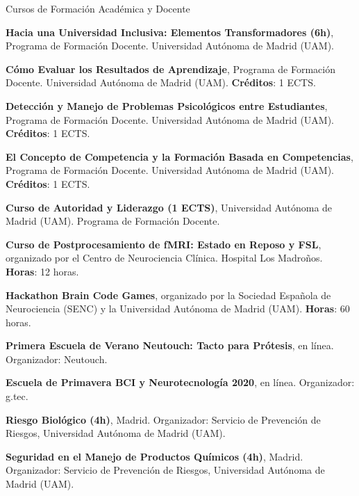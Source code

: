 \begin{rubric}{Cursos de Formación Académica y Docente}
	
	\entry*[9-11 de mayo de 2022] \textbf{Hacia una Universidad Inclusiva: Elementos Transformadores (6h)}, Programa de Formación Docente. Universidad Autónoma de Madrid (UAM).
	
	
	\entry*[15-17 de febrero de 2023] \textbf{Cómo Evaluar los Resultados de Aprendizaje}, Programa de Formación Docente. Universidad Autónoma de Madrid (UAM). \textbf{Créditos}: 1 ECTS.
	
	\entry*[20-27 de abril de 2023] \textbf{Detección y Manejo de Problemas Psicológicos entre Estudiantes}, Programa de Formación Docente. Universidad Autónoma de Madrid (UAM). \textbf{Créditos}: 1 ECTS.
	
	\entry*[17-24 de octubre de 2023] \textbf{El Concepto de Competencia y la Formación Basada en Competencias}, Programa de Formación Docente. Universidad Autónoma de Madrid (UAM). \textbf{Créditos}: 1 ECTS.
	
	\entry*[19-20 de febrero de 2024] \textbf{Curso de Autoridad y Liderazgo (1 ECTS)}, Universidad Autónoma de Madrid (UAM). Programa de Formación Docente.
	
	
	
	\entry*[Febrero 2024] \textbf{Curso de Postprocesamiento de fMRI: Estado en Reposo y FSL}, organizado por el Centro de Neurociencia Clínica. Hospital Los Madroños. \textbf{Horas}: 12 horas.
	
	\entry*[Octubre 2021] \textbf{Hackathon Brain Code Games}, organizado por la Sociedad Española de Neurociencia (SENC) y la Universidad Autónoma de Madrid (UAM). \textbf{Horas}: 60 horas.
	
	\entry*[Octubre 2020] \textbf{Primera Escuela de Verano Neutouch: Tacto para Prótesis}, en línea. Organizador: Neutouch.
	
	\entry*[Abril 2020] \textbf{Escuela de Primavera BCI y Neurotecnología 2020}, en línea. Organizador: g.tec.
	
	
	\entry*[18 de junio de 2019] \textbf{Riesgo Biológico (4h)}, Madrid. Organizador: Servicio de Prevención de Riesgos, Universidad Autónoma de Madrid (UAM).
	
	\entry*[4 de julio de 2019] \textbf{Seguridad en el Manejo de Productos Químicos (4h)}, Madrid. Organizador: Servicio de Prevención de Riesgos, Universidad Autónoma de Madrid (UAM).
	
	
	

\end{rubric}
